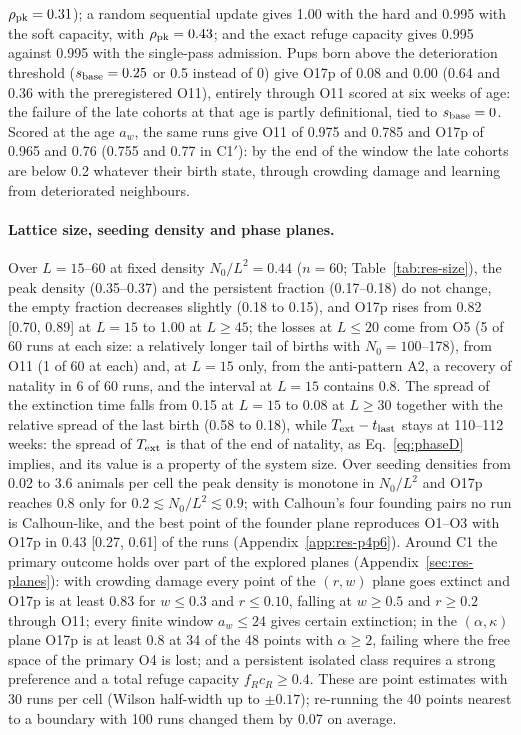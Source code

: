 $\rho_{\rm pk}=0.31$); a random sequential update gives 1.00
with the hard and 0.995 with the soft capacity, with $\rho_{\rm pk}=0.43$; and the exact
refuge capacity gives 0.995 against 0.995 with the single-pass admission. Pups born above the
deterioration threshold ($s_{\rm base}=0.25$ or 0.5 instead of 0) give O17p of 0.08 and 0.00 (0.64 and 0.36 with
the preregistered O11), entirely through O11 scored at six weeks of age: the failure of the late cohorts at that age is
partly definitional, tied to $s_{\rm base}=0$. Scored at the age $a_w$, the same runs give O11 of 0.975 and 0.785
and O17p of 0.965 and 0.76 (0.755 and 0.77 in \textsf{C1}$'$): by the end of the window the late cohorts are below
0.2 whatever their birth state, through crowding damage and learning from deteriorated neighbours.

\paragraph{Lattice size, seeding density and phase planes.}
Over $L=15$--60 at fixed density $N_0/L^2=0.44$ ($n=60$; Table~\ref{tab:res-size}), the peak density (0.35--0.37)
and the persistent fraction (0.17--0.18) do not change, the empty fraction decreases slightly (0.18 to 0.15), and
O17p rises from 0.82 [0.70, 0.89] at $L=15$ to 1.00 at $L\ge45$; the losses at $L\le20$ come from O5 (5 of 60 runs
at each size: a relatively longer tail of births with $N_0=100$--178), from O11 (1 of 60 at each) and, at $L=15$
only, from the anti-pattern A2, a recovery of natality in 6 of 60 runs, and the interval at $L=15$ contains 0.8.
The spread of the extinction time falls from 0.15
at $L=15$ to 0.08 at $L\ge30$ together with the relative spread of the last birth (0.58 to 0.18), while
$T_{\rm ext}-t_{\rm last}$ stays at 110--112 weeks: the spread of $T_{\rm ext}$ is that of the end of natality, as
Eq.~\eqref{eq:phaseD} implies, and its value is a property of the system size. Over seeding densities from 0.02 to
3.6 animals per cell the peak density is monotone in $N_0/L^2$ and O17p reaches 0.8 only for
$0.2\lesssim N_0/L^2\lesssim0.9$; with Calhoun's four founding pairs no run is Calhoun-like, and the best point of
the founder plane reproduces O1--O3 with O17p in 0.43 [0.27, 0.61] of the runs (Appendix~\ref{app:res-p4p6}).
Around \textsf{C1} the primary outcome holds over part of the explored planes (Appendix~\ref{sec:res-planes}): with
crowding damage every point of the $(r,w)$ plane goes extinct and O17p is at least 0.83 for $w\le0.3$ and
$r\le0.10$, falling at $w\ge0.5$ and $r\ge0.2$ through O11; every finite window $a_w\le24$ gives certain
extinction; in the $(\alpha,\kappa)$ plane O17p is at least 0.8 at 34 of the 48 points with $\alpha\ge2$, failing
where the free space of the primary O4 is lost; and a persistent isolated class requires a strong preference and a
total refuge capacity $f_Rc_R\ge0.4$. These are point estimates with 30 runs per cell (Wilson half-width up to
$\pm0.17$); re-running the 40 points nearest to a boundary with 100 runs changed them by 0.07 on average.

